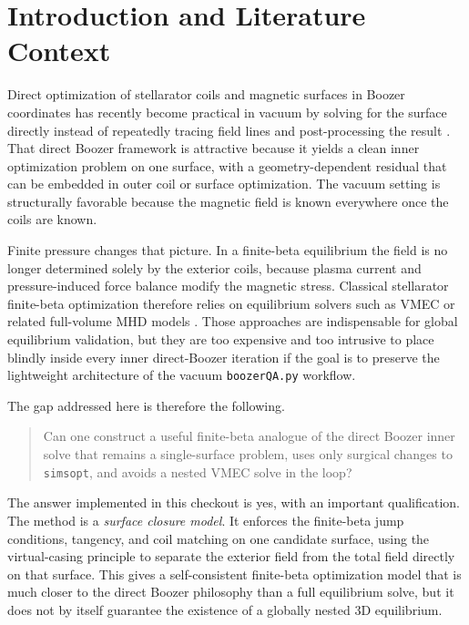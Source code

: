 \documentclass[11pt]{article}
\begin{document}
\section{Introduction and Literature Context}
Direct optimization of stellarator coils and magnetic surfaces in Boozer coordinates has recently become practical in vacuum by solving for the surface directly instead of repeatedly tracing field lines and post-processing the result \cite{Giuliani2022,Giuliani2023,Wechsung2022}. That direct Boozer framework is attractive because it yields a clean inner optimization problem on one surface, with a geometry-dependent residual that can be embedded in outer coil or surface optimization. The vacuum setting is structurally favorable because the magnetic field is known everywhere once the coils are known.

Finite pressure changes that picture. In a finite-beta equilibrium the field is no longer determined solely by the exterior coils, because plasma current and pressure-induced force balance modify the magnetic stress. Classical stellarator finite-beta optimization therefore relies on equilibrium solvers such as VMEC or related full-volume MHD models \cite{HirshmanWhitson1983,Baillod2022}. Those approaches are indispensable for global equilibrium validation, but they are too expensive and too intrusive to place blindly inside every inner direct-Boozer iteration if the goal is to preserve the lightweight architecture of the vacuum \texttt{boozerQA.py} workflow.

The gap addressed here is therefore the following.

\begin{quote}
Can one construct a useful finite-beta analogue of the direct Boozer inner solve that remains a single-surface problem, uses only surgical changes to \texttt{simsopt}, and avoids a nested VMEC solve in the loop?
\end{quote}

The answer implemented in this checkout is yes, with an important qualification. The method is a \emph{surface closure model}. It enforces the finite-beta jump conditions, tangency, and coil matching on one candidate surface, using the virtual-casing principle to separate the exterior field from the total field directly on that surface. This gives a self-consistent finite-beta optimization model that is much closer to the direct Boozer philosophy than a full equilibrium solve, but it does not by itself guarantee the existence of a globally nested 3D equilibrium.
\end{document}
